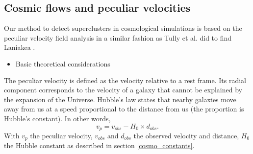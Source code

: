 \documentclass[12pt]{article}
\begin{document}
\subsection{Cosmic flows and peculiar velocities}
\label{sec:peculiar_vel}
Our method to detect superclusters in cosmological
 simulations is based on the peculiar velocity field
  analysis in a similar fashion as Tully et al. did to find Laniakea \cite{tully_laniakea_2014}
    \cite{tempel_cosmology:_2014}.
\begin{itemize}
\item Basic theoretical considerations
\end{itemize}
\begin{par}
The peculiar velocity is defined as the velocity relative to a rest frame. Its radial component corresponds to the velocity of a galaxy that cannot be explained by the expansion of the Universe. Hubble's law states that nearby galaxies move away from us at a speed proportional to the distance from us (the proportion is Hubble's constant). In other words,
\[ 
v_p = v_{obs} - H_{0} \times d_{obs} .
\]
With $v_p$ the peculiar velocity, $v_{obs}$ and $d_{obs}$ the observed velocity and distance, $H_{0}$ the Hubble constant as described in section \ref{cosmo_constants}.
\end{par}
\end{document}
